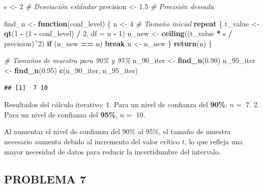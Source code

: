 \documentclass[
]{article}
\newenvironment{Shaded}{\begin{snugshade}}{\end{snugshade}}
\newcommand{\AttributeTok}[1]{\textcolor[rgb]{0.13,0.29,0.53}{#1}}
\newcommand{\CommentTok}[1]{\textcolor[rgb]{0.56,0.35,0.01}{\textit{#1}}}
\newcommand{\ControlFlowTok}[1]{\textcolor[rgb]{0.13,0.29,0.53}{\textbf{#1}}}
\newcommand{\DecValTok}[1]{\textcolor[rgb]{0.00,0.00,0.81}{#1}}
\newcommand{\FloatTok}[1]{\textcolor[rgb]{0.00,0.00,0.81}{#1}}
\newcommand{\FunctionTok}[1]{\textcolor[rgb]{0.13,0.29,0.53}{\textbf{#1}}}
\newcommand{\NormalTok}[1]{#1}
\newcommand{\OtherTok}[1]{\textcolor[rgb]{0.56,0.35,0.01}{#1}}
\newcommand{\SpecialCharTok}[1]{\textcolor[rgb]{0.81,0.36,0.00}{\textbf{#1}}}
\begin{document}
\begin{Shaded}
\begin{Highlighting}[]
\NormalTok{s }\OtherTok{\textless{}{-}} \DecValTok{2}          \CommentTok{\# Desviación estándar}
\NormalTok{precision }\OtherTok{\textless{}{-}} \FloatTok{1.5}  \CommentTok{\# Precisión deseada}

\NormalTok{find\_n }\OtherTok{\textless{}{-}} \ControlFlowTok{function}\NormalTok{(conf\_level) \{}
\NormalTok{  n }\OtherTok{\textless{}{-}} \DecValTok{4}  \CommentTok{\# Tamaño inicial}
  \ControlFlowTok{repeat}\NormalTok{ \{}
\NormalTok{    t\_value }\OtherTok{\textless{}{-}} \FunctionTok{qt}\NormalTok{(}\DecValTok{1} \SpecialCharTok{{-}}\NormalTok{ (}\DecValTok{1} \SpecialCharTok{{-}}\NormalTok{ conf\_level) }\SpecialCharTok{/} \DecValTok{2}\NormalTok{, }\AttributeTok{df =}\NormalTok{ n }\SpecialCharTok{{-}} \DecValTok{1}\NormalTok{)}
\NormalTok{    n\_new }\OtherTok{\textless{}{-}} \FunctionTok{ceiling}\NormalTok{((t\_value }\SpecialCharTok{*}\NormalTok{ s }\SpecialCharTok{/}\NormalTok{ precision)}\SpecialCharTok{\^{}}\DecValTok{2}\NormalTok{)}
    \ControlFlowTok{if}\NormalTok{ (n\_new }\SpecialCharTok{==}\NormalTok{ n) }\ControlFlowTok{break}
\NormalTok{    n }\OtherTok{\textless{}{-}}\NormalTok{ n\_new}
\NormalTok{  \}}
  \FunctionTok{return}\NormalTok{(n)}
\NormalTok{\}}

\CommentTok{\# Tamaños de muestra para 90\% y 95\%}
\NormalTok{n\_90\_iter }\OtherTok{\textless{}{-}} \FunctionTok{find\_n}\NormalTok{(}\FloatTok{0.90}\NormalTok{)}
\NormalTok{n\_95\_iter }\OtherTok{\textless{}{-}} \FunctionTok{find\_n}\NormalTok{(}\FloatTok{0.95}\NormalTok{)}
\FunctionTok{c}\NormalTok{(n\_90\_iter, n\_95\_iter)}
\end{Highlighting}
\end{Shaded}

\begin{verbatim}
## [1]  7 10
\end{verbatim}

Resultados del cálculo iterativo:
1. Para un nivel de confianza del \textbf{90\%}, \(n =\) 7.
2. Para un nivel de confianza del \textbf{95\%}, \(n =\) 10.

Al aumentar el nivel de confianza del 90\% al 95\%, el tamaño de muestra necesario aumenta debido al incremento del valor crítico \(t\), lo que refleja una mayor necesidad de datos para reducir la incertidumbre del intervalo.

\subsection{PROBLEMA 7}\label{problema-7}
\end{document}
